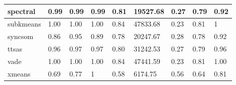 \begin{table}[H]
\begin{tabular}{|l|l|l|l|l|l|l|l|l|}
\hline
spectral & 0.99 & 0.99 & 0.99 & 0.81 & 19527.68 & 0.27 & 0.79 & 0.92 \\
\hline
subkmeans & 1.00 & 1.00 & 1.00 & 0.84 & 47833.68 & 0.23 & 0.81 & 1 \\
\hline
syncsom & 0.86 & 0.95 & 0.89 & 0.78 & 20247.67 & 0.28 & 0.78 & 0.92 \\
\hline
ttsas & 0.96 & 0.97 & 0.97 & 0.80 & 31242.53 & 0.27 & 0.79 & 0.96 \\
\hline
vade & 1.00 & 1.00 & 1.00 & 0.84 & 47441.59 & 0.23 & 0.81 & 1.00 \\
\hline
xmeans & 0.69 & 0.77 & 1 & 0.58 & 6174.75 & 0.56 & 0.64 & 0.81 \\
\hline
\end{tabular}
\end{table}



